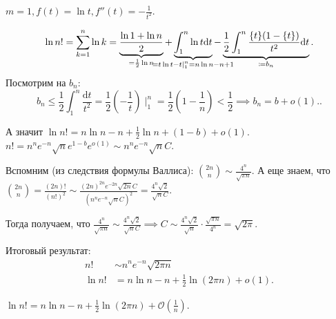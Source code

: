 \begin{example}
    $m = 1, f(t) = \ln t, f''(t) = -\frac{1}{t^2}$.

    \[
        \ln n! = \sum_{k=1}^n \ln k = \underbrace{\frac{\ln 1 + \ln n}{2}}_{= \frac{1}{2} \ln n} + \underbrace{\int_1^n \ln t \mathrm{d}t}_{\mathclap{=t\ln t-t\mid_1^n = n\ln n - n + 1}} - \underbrace{\frac{1}{2} \int_1^n \frac{\{t\}(1-\{t\})}{t^2} \mathrm{d}t}_{\coloneqq b_n}
    .\] 
    Посмотрим на $b_n$:  \[
        b_n \le \frac{1}{2} \int_1^n \frac{\mathrm{d}t}{t^2} = \frac{1}{2} (-\frac{1}{t}) \mid_1^n = \frac{1}{2} (1-\frac{1}{n}) < \frac{1}{2} \implies b_n = b + o(1).
    .\] 

    А значит $\ln n! = n \ln n - n + \frac{1}{2} \ln n + (1-b) + o(1)$.
    $n! = n^n e^{-n} \sqrt{n} e^{1-b} e^{o(1)} \sim n^n e^{-n} \sqrt{n} C$.

    Вспомним (из следствия формулы Валлиса): $\binom{2n}{n} \sim \frac{4^n}{\sqrt{\pi n}}$. А еще знаем, что $\binom{2n}{n} = \frac{(2n)!}{(n!)^2} \sim \frac{(2n)^{2n}e^{-2n}\sqrt{2n}C}{(n^n e^{-n}\sqrt{n}C)^2} = \frac{4^n \sqrt{2}}{\sqrt{n}C}$.

    Тогда получаем, что $\frac{4^n}{\sqrt{\pi n}} \sim \frac{4^n \sqrt{2}}{\sqrt{n}C} \implies C \sim \frac{4^n \sqrt{2}}{\sqrt{n}} \cdot \frac{\sqrt{\pi n}}{4^n} = \sqrt{2\pi}$.

    Итоговый результат: \begin{align*}
        n! &\sim n^n e^{-n} \sqrt{2\pi n}\\
        \ln n! &= n \ln n - n + \frac{1}{2} \ln (2\pi n) + o(1)
    .\end{align*}
\end{example}
\begin{remark}
    $\ln n! = n \ln n - n + \frac{1}{2} \ln(2 \pi n) + \mathcal{O}(\frac{1}{n})$.
\end{remark}
